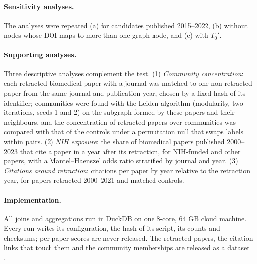 \paragraph{Sensitivity analyses.} The analyses were repeated (a) for candidates published 2015--2022, (b) without
nodes whose DOI maps to more than one graph node, and (c) with $T_0'$.

\paragraph{Supporting analyses.} Three descriptive analyses complement the test. (1) \emph{Community concentration}:
each retracted biomedical paper with a journal was matched to one non-retracted paper from the same journal and
publication year, chosen by a fixed hash of its identifier; communities were found with the Leiden algorithm \citep{traag2019leiden} (modularity, two iterations, seeds 1
and 2) on the subgraph formed by
these papers and their neighbours, and the concentration of retracted papers over communities was compared with that
of the controls under a permutation null that swaps labels within pairs. (2) \emph{NIH exposure}: the share of
biomedical papers published 2000--2023 that cite a paper in a year after its retraction, for NIH-funded and other
papers, with a Mantel--Haenszel odds ratio stratified by journal and year. (3) \emph{Citations around retraction}:
citations per paper by year relative to the retraction year, for papers retracted 2000--2021 and matched controls.

\paragraph{Implementation.} All joins and aggregations run in DuckDB \citep{raasveldt2019duckdb} on one 8-core, 64 GB
cloud machine. Every run writes its configuration, the hash of its script, its counts and checksums; per-paper scores
are never released. The retracted papers, the citation links that touch them and the community memberships are
released as a dataset \citep{arjomandi2026retracteddata}.
